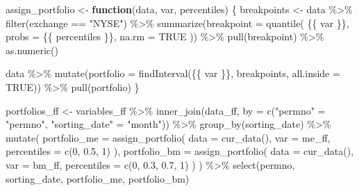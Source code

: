 \documentclass[
]{krantz}
\newenvironment{Shaded}{\begin{snugshade}}{\end{snugshade}}
\newcommand{\AttributeTok}[1]{\textcolor[rgb]{0.61,0.61,0.61}{#1}}
\newcommand{\ConstantTok}[1]{\textcolor[rgb]{0,0,0}{#1}}
\newcommand{\ControlFlowTok}[1]{\textcolor[rgb]{0.27,0.27,0.27}{\textbf{#1}}}
\newcommand{\DecValTok}[1]{\textcolor[rgb]{0.06,0.06,0.06}{#1}}
\newcommand{\FloatTok}[1]{\textcolor[rgb]{0.06,0.06,0.06}{#1}}
\newcommand{\FunctionTok}[1]{\textcolor[rgb]{0,0,0}{#1}}
\newcommand{\NormalTok}[1]{#1}
\newcommand{\OtherTok}[1]{\textcolor[rgb]{0.37,0.37,0.37}{#1}}
\newcommand{\SpecialCharTok}[1]{\textcolor[rgb]{0,0,0}{#1}}
\newcommand{\StringTok}[1]{\textcolor[rgb]{0.5,0.5,0.5}{#1}}
\begin{document}
\begin{Shaded}
\begin{Highlighting}[]
\NormalTok{assign\_portfolio }\OtherTok{\textless{}{-}} \ControlFlowTok{function}\NormalTok{(data, var, percentiles) \{}
\NormalTok{  breakpoints }\OtherTok{\textless{}{-}}\NormalTok{ data }\SpecialCharTok{\%\textgreater{}\%}
    \FunctionTok{filter}\NormalTok{(exchange }\SpecialCharTok{==} \StringTok{"NYSE"}\NormalTok{) }\SpecialCharTok{\%\textgreater{}\%}
    \FunctionTok{summarize}\NormalTok{(}\AttributeTok{breakpoint =} \FunctionTok{quantile}\NormalTok{(}
\NormalTok{      \{\{ var \}\},}
      \AttributeTok{probs =}\NormalTok{ \{\{ percentiles \}\},}
      \AttributeTok{na.rm =} \ConstantTok{TRUE}
\NormalTok{    )) }\SpecialCharTok{\%\textgreater{}\%}
    \FunctionTok{pull}\NormalTok{(breakpoint) }\SpecialCharTok{\%\textgreater{}\%}
    \FunctionTok{as.numeric}\NormalTok{()}

\NormalTok{  data }\SpecialCharTok{\%\textgreater{}\%}
    \FunctionTok{mutate}\NormalTok{(}\AttributeTok{portfolio =} \FunctionTok{findInterval}\NormalTok{(\{\{ var \}\}, breakpoints, }\AttributeTok{all.inside =} \ConstantTok{TRUE}\NormalTok{)) }\SpecialCharTok{\%\textgreater{}\%}
    \FunctionTok{pull}\NormalTok{(portfolio)}
\NormalTok{\}}

\NormalTok{portfolios\_ff }\OtherTok{\textless{}{-}}\NormalTok{ variables\_ff }\SpecialCharTok{\%\textgreater{}\%}
  \FunctionTok{inner\_join}\NormalTok{(data\_ff, }\AttributeTok{by =} \FunctionTok{c}\NormalTok{(}\StringTok{"permno"} \OtherTok{=} \StringTok{"permno"}\NormalTok{, }\StringTok{"sorting\_date"} \OtherTok{=} \StringTok{"month"}\NormalTok{)) }\SpecialCharTok{\%\textgreater{}\%}
  \FunctionTok{group\_by}\NormalTok{(sorting\_date) }\SpecialCharTok{\%\textgreater{}\%}
  \FunctionTok{mutate}\NormalTok{(}
    \AttributeTok{portfolio\_me =} \FunctionTok{assign\_portfolio}\NormalTok{(}
      \AttributeTok{data =} \FunctionTok{cur\_data}\NormalTok{(),}
      \AttributeTok{var =}\NormalTok{ me\_ff,}
      \AttributeTok{percentiles =} \FunctionTok{c}\NormalTok{(}\DecValTok{0}\NormalTok{, }\FloatTok{0.5}\NormalTok{, }\DecValTok{1}\NormalTok{)}
\NormalTok{    ),}
    \AttributeTok{portfolio\_bm =} \FunctionTok{assign\_portfolio}\NormalTok{(}
      \AttributeTok{data =} \FunctionTok{cur\_data}\NormalTok{(),}
      \AttributeTok{var =}\NormalTok{ bm\_ff,}
      \AttributeTok{percentiles =} \FunctionTok{c}\NormalTok{(}\DecValTok{0}\NormalTok{, }\FloatTok{0.3}\NormalTok{, }\FloatTok{0.7}\NormalTok{, }\DecValTok{1}\NormalTok{)}
\NormalTok{    )}
\NormalTok{  ) }\SpecialCharTok{\%\textgreater{}\%}
  \FunctionTok{select}\NormalTok{(permno, sorting\_date, portfolio\_me, portfolio\_bm)}
\end{Highlighting}
\end{Shaded}
\end{document}
